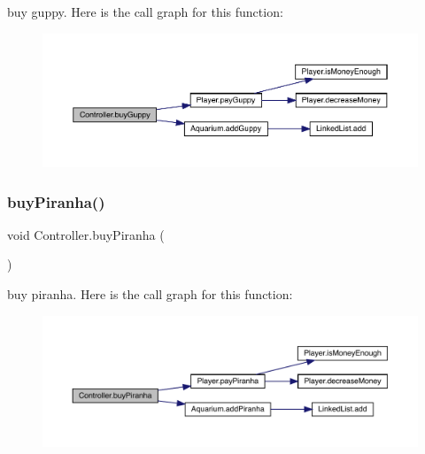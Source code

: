 buy guppy. Here is the call graph for this function\+:
\nopagebreak
\begin{figure}[H]
\begin{center}
\leavevmode
\includegraphics[width=350pt]{class_controller_adb93f92dca6e1d48d61d811411945aff_cgraph}
\end{center}
\end{figure}
\mbox{\label{class_controller_aeea16d5cb5dc9ea882583b621c1205f9}} 
\subsubsection{\texorpdfstring{buy\+Piranha()}{buyPiranha()}}
{\footnotesize\ttfamily void Controller.\+buy\+Piranha (\begin{DoxyParamCaption}{ }\end{DoxyParamCaption})\hspace{0.3cm}{\ttfamily [inline]}}

buy piranha. Here is the call graph for this function\+:
\nopagebreak
\begin{figure}[H]
\begin{center}
\leavevmode
\includegraphics[width=350pt]{class_controller_aeea16d5cb5dc9ea882583b621c1205f9_cgraph}
\end{center}
\end{figure}
\mbox{\label{class_controller_afcc995c6e49e732f0542a4dee21921d2}} 
